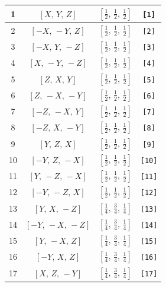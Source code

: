 \documentclass[fleqn,8pt]{jsarticle}
\begin{document}
\begin{longtable}{cccc}
1 & $\left[ X,\, Y,\, Z \right]$ & $\left[ \frac{1}{2},\, \frac{1}{2},\, \frac{1}{2} \right]$ & {\tt [1]} \\ \hline
2 & $\left[ - X,\, - Y,\, Z \right]$ & $\left[ \frac{1}{2},\, \frac{1}{2},\, \frac{1}{2} \right]$ & {\tt [2]} \\ \hline
3 & $\left[ - X,\, Y,\, - Z \right]$ & $\left[ \frac{1}{2},\, \frac{1}{2},\, \frac{1}{2} \right]$ & {\tt [3]} \\ \hline
4 & $\left[ X,\, - Y,\, - Z \right]$ & $\left[ \frac{1}{2},\, \frac{1}{2},\, \frac{1}{2} \right]$ & {\tt [4]} \\ \hline
5 & $\left[ Z,\, X,\, Y \right]$ & $\left[ \frac{1}{2},\, \frac{1}{2},\, \frac{1}{2} \right]$ & {\tt [5]} \\ \hline
6 & $\left[ Z,\, - X,\, - Y \right]$ & $\left[ \frac{1}{2},\, \frac{1}{2},\, \frac{1}{2} \right]$ & {\tt [6]} \\ \hline
7 & $\left[ - Z,\, - X,\, Y \right]$ & $\left[ \frac{1}{2},\, \frac{1}{2},\, \frac{1}{2} \right]$ & {\tt [7]} \\ \hline
8 & $\left[ - Z,\, X,\, - Y \right]$ & $\left[ \frac{1}{2},\, \frac{1}{2},\, \frac{1}{2} \right]$ & {\tt [8]} \\ \hline
9 & $\left[ Y,\, Z,\, X \right]$ & $\left[ \frac{1}{2},\, \frac{1}{2},\, \frac{1}{2} \right]$ & {\tt [9]} \\ \hline
10 & $\left[ - Y,\, Z,\, - X \right]$ & $\left[ \frac{1}{2},\, \frac{1}{2},\, \frac{1}{2} \right]$ & {\tt [10]} \\ \hline
11 & $\left[ Y,\, - Z,\, - X \right]$ & $\left[ \frac{1}{2},\, \frac{1}{2},\, \frac{1}{2} \right]$ & {\tt [11]} \\ \hline
12 & $\left[ - Y,\, - Z,\, X \right]$ & $\left[ \frac{1}{2},\, \frac{1}{2},\, \frac{1}{2} \right]$ & {\tt [12]} \\ \hline
13 & $\left[ Y,\, X,\, - Z \right]$ & $\left[ \frac{1}{4},\, \frac{3}{4},\, \frac{1}{4} \right]$ & {\tt [13]} \\ \hline
14 & $\left[ - Y,\, - X,\, - Z \right]$ & $\left[ \frac{1}{4},\, \frac{3}{4},\, \frac{1}{4} \right]$ & {\tt [14]} \\ \hline
15 & $\left[ Y,\, - X,\, Z \right]$ & $\left[ \frac{1}{4},\, \frac{3}{4},\, \frac{1}{4} \right]$ & {\tt [15]} \\ \hline
16 & $\left[ - Y,\, X,\, Z \right]$ & $\left[ \frac{1}{4},\, \frac{3}{4},\, \frac{1}{4} \right]$ & {\tt [16]} \\ \hline
17 & $\left[ X,\, Z,\, - Y \right]$ & $\left[ \frac{1}{4},\, \frac{3}{4},\, \frac{1}{4} \right]$ & {\tt [17]} \\ \hline

\end{longtable}
\end{document}
